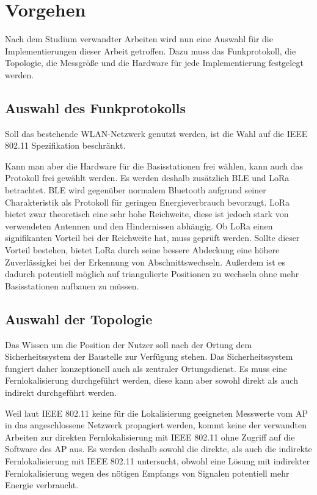 \section{Vorgehen}
Nach dem Studium verwandter Arbeiten wird nun eine Auswahl für die Implementierungen dieser Arbeit getroffen.
Dazu muss das Funkprotokoll, die Topologie, die Messgröße und die Hardware für jede Implementierung festgelegt werden.

\subsection{Auswahl des Funkprotokolls}
Soll das bestehende WLAN-Netzwerk genutzt werden, ist die Wahl auf die IEEE 802.11 Spezifikation beschränkt.

Kann man aber die Hardware für die Basisstationen frei wählen, kann auch das Protokoll frei gewählt werden.
Es werden deshalb zusätzlich BLE und LoRa betrachtet.
BLE wird gegenüber normalem Bluetooth aufgrund seiner Charakteristik als Protokoll für geringen Energieverbrauch bevorzugt.
LoRa bietet zwar theoretisch eine sehr hohe Reichweite, diese ist jedoch stark von verwendeten Antennen und den Hindernissen abhängig.
Ob LoRa einen signifikanten Vorteil bei der Reichweite hat, muss geprüft werden.
Sollte dieser Vorteil bestehen, bietet LoRa durch seine bessere Abdeckung eine höhere Zuverlässigkei bei der Erkennung von Abschnittswechseln. 
Außerdem ist es dadurch potentiell möglich auf triangulierte Positionen zu wechseln ohne mehr Basisstationen aufbauen zu müssen.

\subsection{Auswahl der Topologie}
Das Wissen um die Position der Nutzer soll nach der Ortung dem Sicherheitssystem der Baustelle zur Verfügung stehen. 
Das Sicherheitssystem fungiert daher konzeptionell auch als zentraler Ortungsdienst.
Es muss eine Fernlokalisierung durchgeführt werden, diese kann aber sowohl direkt als auch indirekt durchgeführt werden. 

Weil laut IEEE 802.11 keine für die Lokalisierung geeigneten Messwerte vom AP in das angeschlossene Netzwerk propagiert werden, kommt keine der verwandten Arbeiten zur direkten Fernlokalisierung mit IEEE 802.11 ohne Zugriff auf die Software des AP aus.
Es werden deshalb sowohl die direkte, als auch die indirekte Fernlokalisierung mit IEEE 802.11 untersucht, obwohl eine Lösung mit indirekter Fernlokalisierung wegen des nötigen Empfangs von Signalen potentiell mehr Energie verbraucht.

